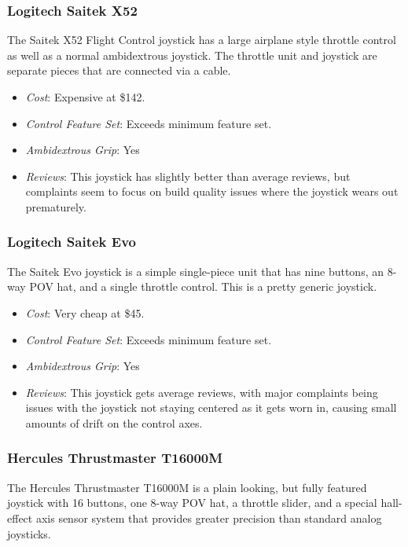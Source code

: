 \documentclass[onecolumn, draftclsnofoot, 10pt, compsoc]{IEEEtran}
\begin{document}
\subsubsection{Logitech Saitek X52}
The Saitek X52 Flight Control joystick has a large airplane style throttle control as well as a normal ambidextrous joystick.
The throttle unit and joystick are separate pieces that are connected via a cable.

\begin{itemize}
\item \textit{Cost}: Expensive at \$142.
\item \textit{Control Feature Set}: Exceeds minimum feature set.
\item \textit{Ambidextrous Grip}: Yes
\item \textit{Reviews}: This joystick has slightly better than average reviews, but complaints seem to focus on build quality issues where the joystick wears out prematurely.
\end{itemize}

\subsubsection{Logitech Saitek Evo}
The Saitek Evo joystick is a simple single-piece unit that has nine buttons, an 8-way POV hat, and a single throttle control. This is a pretty generic joystick.

\begin{itemize}
\item \textit{Cost}: Very cheap at \$45.
\item \textit{Control Feature Set}: Exceeds minimum feature set.
\item \textit{Ambidextrous Grip}: Yes
\item \textit{Reviews}: This joystick gets average reviews, with major complaints being issues with the joystick not staying centered as it gets worn in, causing small amounts of drift on the control axes.
\end{itemize}

\subsubsection{Hercules Thrustmaster T16000M}
The Hercules Thrustmaster T16000M is a plain looking, but fully featured joystick with 16 buttons, one 8-way POV hat, a throttle slider, and a special hall-effect axis sensor system that provides greater precision than standard analog joysticks.
\end{document}
